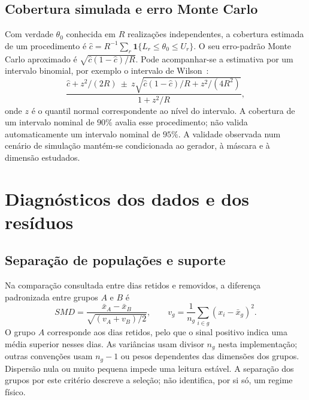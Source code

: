 \subsection{Cobertura simulada e erro Monte Carlo}
\label{sec:mat-cobertura-mc}
Com verdade $\theta_0$ conhecida em $R$ realizações independentes, a cobertura estimada de um procedimento é $\widehat c=R^{-1}\sum_r\mathbf1\{L_r\leq\theta_0\leq U_r\}$. O seu erro-padrão Monte Carlo aproximado é $\sqrt{\widehat c(1-\widehat c)/R}$. Pode acompanhar-se a estimativa por um intervalo binomial, por exemplo o intervalo de Wilson~\parencite{Wilson1927}:
\begin{equation}
\frac{\widehat c+z^2/(2R)\ \pm\ z\sqrt{\widehat c(1-\widehat c)/R+z^2/(4R^2)}}{1+z^2/R},
\label{eq:mat-wilson}
\end{equation}
onde $z$ é o quantil normal correspondente ao nível do intervalo. A cobertura de um intervalo nominal de $90\%$ avalia esse procedimento; não valida automaticamente um intervalo nominal de $95\%$. A validade observada num cenário de simulação mantém-se condicionada ao gerador, à máscara e à dimensão estudados.


\section{Diagnósticos dos dados e dos resíduos}
\label{sec:mat-diagnosticos}

\subsection{Separação de populações e suporte}
\label{sec:mat-suporte}
Na comparação consultada entre dias retidos e removidos, a diferença padronizada entre grupos $A$ e $B$ é
\begin{equation}
SMD=\frac{\bar x_A-\bar x_B}{\sqrt{(v_A+v_B)/2}},
\qquad v_g=\frac1{n_g}\sum_{i\in g}(x_i-\bar x_g)^2.
\label{eq:mat-smd}
\end{equation}
O grupo $A$ corresponde aos dias retidos, pelo que o sinal positivo indica uma média superior nesses dias. As variâncias usam divisor $n_g$ nesta implementação; outras convenções usam $n_g-1$ ou pesos dependentes das dimensões dos grupos. Dispersão nula ou muito pequena impede uma leitura estável. A separação dos grupos por este critério descreve a seleção; não identifica, por si só, um regime físico.

